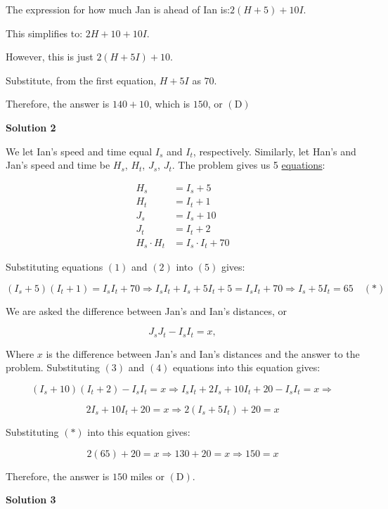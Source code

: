 \begin{enumerate}
 The expression for how much Jan is ahead of Ian is:$2(H+5)+10I.$

 This simplifies to: $2H+10+10I.$

 However, this is just $2(H+5I)+10.$

 Substitute, from the first equation, $H+5I$ as $70.$

 Therefore, the answer is $140 + 10$, which is $150$, or $\boxed{\mathrm{(D)}}$




\textbf{Solution 2}

We let Ian's speed and time equal $I_s$ and $I_t$, respectively. Similarly, let Han's and Jan's speed and time be $H_s$, $H_t$, $J_s$, $J_t$. The problem gives us 5 \href{https://artofproblemsolving.com/wiki/index.php?title=Equation}{equations}:

 
 \begin{align} H_s&=I_s+5 \\ H_t&=I_t+1 \\ J_s&=I_s+10 \\ J_t&=I_t+2 \\ H_s \cdot H_t & =I_s \cdot I_t+70 \end{align}

 Substituting equations $(1)$ and $(2)$ into $(5)$ gives:

 
 \[(I_s+5)(I_t+1)=I_s I_t+70 \Longrightarrow I_s I_t+I_s+5I_t+5=I_s I_t+70 \Longrightarrow I_s+5I_t=65 \quad (*)\]

 We are asked the difference between Jan's and Ian's distances, or

 
 \[J_s J_t-I_s I_t=x,\]

 Where $x$ is the difference between Jan's and Ian's distances and the answer to the problem. Substituting $(3)$ and $(4)$ equations into this equation gives:

 
 \[(I_s+10)(I_t+2)-I_s I_t=x \Longrightarrow I_s I_t+2I_s+10I_t+20-I_s I_t=x \Longrightarrow\]

 \[2I_s+10I_t+20=x \Longrightarrow 2(I_s+5I_t)+20=x\]

 Substituting $(*)$ into this equation gives:

 
 \[2(65)+20=x \Longrightarrow 130+20=x \Longrightarrow 150=x\]

 Therefore, the answer is $150$ miles or $\boxed{\mathrm{(D)}}$.

 



\textbf{Solution 3}


\end{enumerate}

